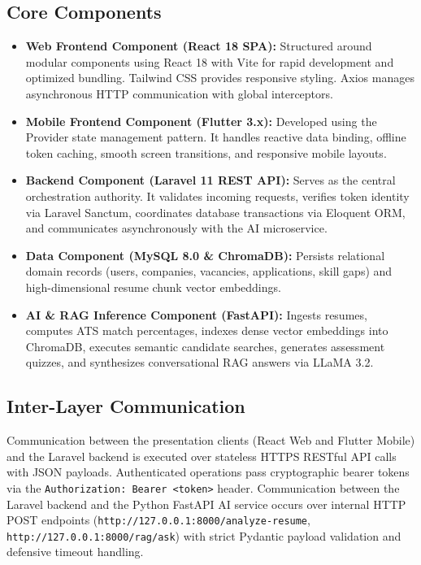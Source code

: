 \subsection{Core Components}
\begin{itemize}
    \item \textbf{Web Frontend Component (React 18 SPA):} Structured around modular components using React 18 with Vite for rapid development and optimized bundling. Tailwind CSS provides responsive styling. Axios manages asynchronous HTTP communication with global interceptors.
    \item \textbf{Mobile Frontend Component (Flutter 3.x):} Developed using the Provider state management pattern. It handles reactive data binding, offline token caching, smooth screen transitions, and responsive mobile layouts.
    \item \textbf{Backend Component (Laravel 11 REST API):} Serves as the central orchestration authority. It validates incoming requests, verifies token identity via Laravel Sanctum, coordinates database transactions via Eloquent ORM, and communicates asynchronously with the AI microservice.
    \item \textbf{Data Component (MySQL 8.0 \& ChromaDB):} Persists relational domain records (users, companies, vacancies, applications, skill gaps) and high-dimensional resume chunk vector embeddings.
    \item \textbf{AI \& RAG Inference Component (FastAPI):} Ingests resumes, computes ATS match percentages, indexes dense vector embeddings into ChromaDB, executes semantic candidate searches, generates assessment quizzes, and synthesizes conversational RAG answers via LLaMA 3.2.
\end{itemize}

\subsection{Inter-Layer Communication}
Communication between the presentation clients (React Web and Flutter Mobile) and the Laravel backend is executed over stateless HTTPS RESTful API calls with JSON payloads. Authenticated operations pass cryptographic bearer tokens via the \texttt{Authorization: Bearer <token>} header. Communication between the Laravel backend and the Python FastAPI AI service occurs over internal HTTP POST endpoints (\texttt{http://127.0.0.1:8000/analyze-resume}, \texttt{http://127.0.0.1:8000/rag/ask}) with strict Pydantic payload validation and defensive timeout handling.

